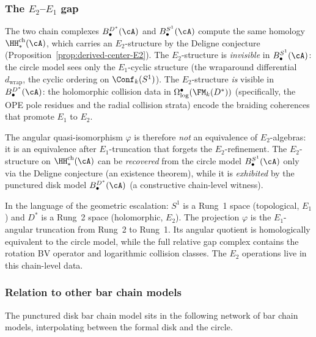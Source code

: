 \subsubsection{\texorpdfstring{The $E_2$--$E_1$ gap}{The E2--E1 gap}}

\begin{remark}%
\label{rem:E2-E1-chain-gap}%
%
%
The two chain complexes $B^{D^*}_\bullet(\cA)$
and $B^{S^1}_\bullet(\cA)$ compute the same
homology $\HH^{\mathrm{ch}}_*(\cA)$, which carries
an $E_2$-structure by the Deligne conjecture
\textup{(}Proposition~\textup{\ref{prop:derived-center-E2}}\textup{)}.
The $E_2$-structure is \emph{invisible} in
$B^{S^1}_\bullet(\cA)$: the circle model sees
only the $E_1$-cyclic structure (the wraparound
differential $d_{\mathrm{wrap}}$, the cyclic
ordering on $\Conf_k(S^1)$). The $E_2$-structure
\emph{is} visible in $B^{D^*}_\bullet(\cA)$: the
holomorphic collision data in
$\Omega^\bullet_{\log}(\FM_k(D^*))$ (specifically,
the OPE pole residues and the radial collision
strata) encode the braiding coherences that promote
$E_1$ to $E_2$.

The angular quasi-isomorphism $\varphi$ is therefore
\emph{not} an equivalence of $E_2$-algebras: it is
an equivalence after \(E_1\)-truncation that forgets the
$E_2$-refinement. The $E_2$-structure on
$\HH^{\mathrm{ch}}_*(\cA)$ can be
\emph{recovered} from the circle model $B^{S^1}_\bullet(\cA)$
only via the Deligne conjecture (an existence theorem),
while it is \emph{exhibited} by the punctured disk
model $B^{D^*}_\bullet(\cA)$ (a constructive chain-level
witness).

In the language of the geometric escalation:
$S^1$ is a Rung~1 space (topological, $E_1$)
and $D^*$ is a Rung~2 space (holomorphic, $E_2$).
The projection \(\varphi\) is the \(E_1\)-angular truncation
from Rung~2 to Rung~1. Its angular quotient is homologically
equivalent to the circle model, while the full relative gap complex
contains the rotation BV operator and logarithmic collision classes.
The $E_2$ operations live in this chain-level data.
\end{remark}

\subsubsection{Relation to other bar chain models}

The punctured disk bar chain model sits in the
following network of bar chain models, interpolating
between the formal disk and the circle.

